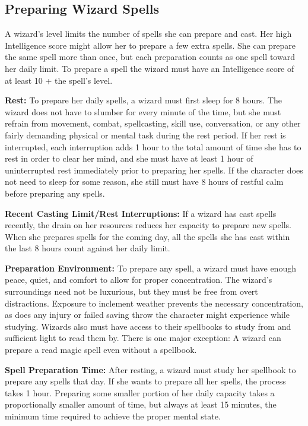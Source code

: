 \subsection{Preparing Wizard Spells}
A wizard's level limits the number of spells she can prepare and cast. Her high Intelligence score might allow her to prepare a few extra spells. She can prepare the same spell more than once, but each preparation counts as one spell toward her daily limit. To prepare a spell the wizard must have an Intelligence score of at least 10 + the spell's level.

\textbf{Rest:} To prepare her daily spells, a wizard must first sleep for 8 hours. The wizard does not have to slumber for every minute of the time, but she must refrain from movement, combat, spellcasting, skill use, conversation, or any other fairly demanding physical or mental task during the rest period. If her rest is interrupted, each interruption adds 1 hour to the total amount of time she has to rest in order to clear her mind, and she must have at least 1 hour of uninterrupted rest immediately prior to preparing her spells. If the character does not need to sleep for some reason, she still must have 8 hours of restful calm before preparing any spells.

\textbf{Recent Casting Limit/Rest Interruptions:} If a wizard has cast spells recently, the drain on her resources reduces her capacity to prepare new spells. When she prepares spells for the coming day, all the spells she has cast within the last 8 hours count against her daily limit.

\textbf{Preparation Environment:} To prepare any spell, a wizard must have enough peace, quiet, and comfort to allow for proper concentration. The wizard's surroundings need not be luxurious, but they must be free from overt distractions. Exposure to inclement weather prevents the necessary concentration, as does any injury or failed saving throw the character might experience while studying. Wizards also must have access to their spellbooks to study from and sufficient light to read them by. There is one major exception: A wizard can prepare a read magic spell even without a spellbook.

\textbf{Spell Preparation Time:} After resting, a wizard must study her spellbook to prepare any spells that day. If she wants to prepare all her spells, the process takes 1 hour. Preparing some smaller portion of her daily capacity takes a proportionally smaller amount of time, but always at least 15 minutes, the minimum time required to achieve the proper mental state.

